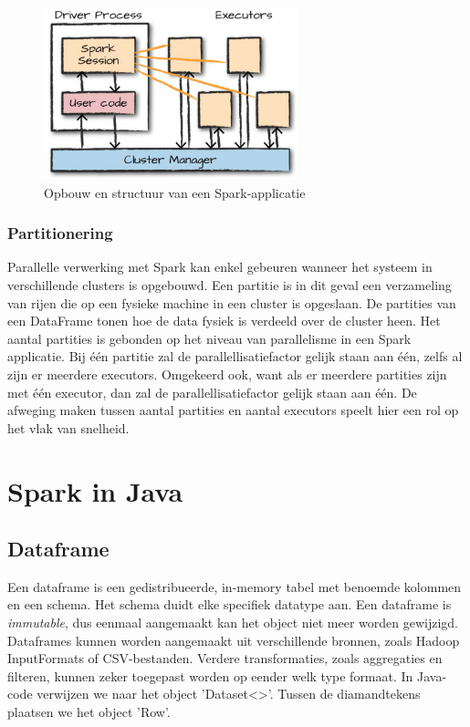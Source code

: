 \documentclass[a4paper,10pt,twoside]{report}
\begin{document}
\begin{figure}
	\begin{center}
		\includegraphics[height=5cm]{images/Screenshot_258.png}
	\end{center}
		\caption{Opbouw en structuur van een Spark-applicatie}
\end{figure}


\subsubsection{Partitionering}

Parallelle verwerking met Spark kan enkel gebeuren wanneer het systeem in verschillende clusters is opgebouwd. Een partitie is in dit geval een verzameling van rijen die op een fysieke machine in een cluster is opgeslaan. De partities van een DataFrame tonen hoe de data fysiek is verdeeld over de cluster heen. Het aantal partities is gebonden op het niveau van parallelisme in een Spark applicatie. Bij één partitie zal de parallellisatiefactor gelijk staan aan één, zelfs al zijn er meerdere executors. Omgekeerd ook, want als er meerdere partities zijn met één executor, dan zal de parallellisatiefactor gelijk staan aan één. De afweging maken tussen aantal partities en aantal executors speelt hier een rol op het vlak van snelheid.

\section{Spark in Java}

\subsection{Dataframe}

Een dataframe is een gedistribueerde, in-memory tabel met benoemde kolommen en een schema. Het schema duidt elke specifiek datatype aan. Een dataframe is \textit{immutable}, dus eenmaal aangemaakt kan het object niet meer worden gewijzigd. Dataframes kunnen worden aangemaakt uit verschillende bronnen, zoals Hadoop InputFormats of CSV-bestanden. Verdere transformaties, zoals aggregaties en filteren, kunnen zeker toegepast worden op eender welk type formaat. In Java-code verwijzen we naar het object 'Dataset<>'. Tussen de diamandtekens plaatsen we het object 'Row'.
\end{document}

